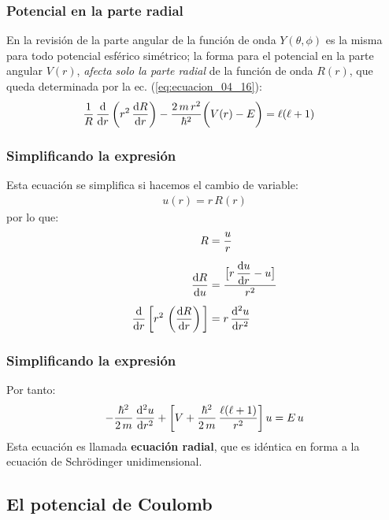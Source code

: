 \documentclass[12pt]{beamer}
\begin{document}
\begin{frame}
\frametitle{Potencial en la parte radial}
En la revisión de la parte angular de la función de onda $Y(\theta, \phi)$ es la misma para todo potencial esférico simétrico; la forma para el potencial en la parte angular $V(r)$, \emph{afecta solo la parte radial} de la función de onda $R(r)$, que queda determinada por la ec. (\ref{eq:ecuacion_04_16}):
\pause
\begin{align*}
    \dfrac{1}{R} \, \dv{r} \left( r^{2} \, \dv{R}{r} \right) - \dfrac{2 \, m \, r^{2}}{\hbar^{2}} \bigg( V(r) - E \bigg) &= \ell (\ell + 1)
\end{align*}
\end{frame}
\begin{frame}
\frametitle{Simplificando la expresión}
Esta ecuación se simplifica si hacemos el cambio de variable:
\pause
\begin{align}
    u(r) = r \, R(r)
    \label{eq:ecuacion_04_36}
\end{align}
\pause
por lo que:
\begin{align*}
    R &= \dfrac{u}{r} \\[0.5em]
    \dv{R}{u} &= \dfrac{ \big[ r \, \displaystyle \dv{u}{r} - u \big]}{r^{2}} \\[0.5em]
    \dv{r} \, \bigg[ r^{2} \, \left( \dv{R}{r} \right) \bigg] &= r \, \dv[2]{u}{r}
\end{align*}
\end{frame}
\begin{frame}
\frametitle{Simplificando la expresión}
Por tanto:
\begin{align}
    - \dfrac{\hbar^{2}}{2 \, m} \, \dv[2]{u}{r} + \bigg[ V + \dfrac{\hbar^{2}}{2 \, m} \,\dfrac{\ell (\ell + 1)}{r^{2}} \bigg] \, u =  E \, u
    \label{eq:ecuacion_04_37}
\end{align}
\pause
Esta ecuación es llamada \textbf{ecuación radial}, que es idéntica en forma a la ecuación de Schrödinger unidimensional.
\end{frame}

\subsection{El potencial de Coulomb}
\end{document}
